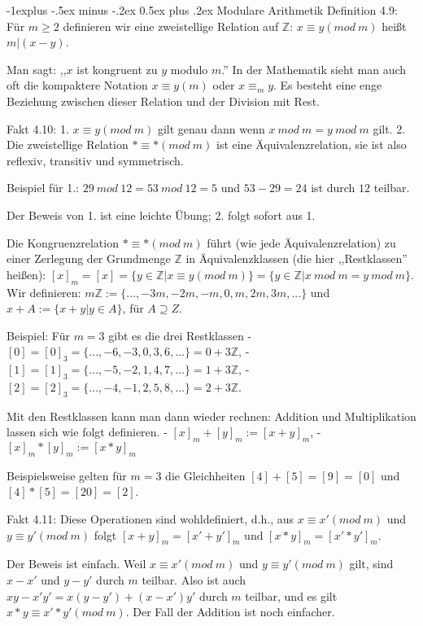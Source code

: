 \documentclass[a4paper]{article}
\makeatletter
\renewcommand{\subsection}{\@startsection{subsection}{2}{0mm}%
 {-1explus -.5ex minus -.2ex}%
 {0.5ex plus .2ex}%
 {\normalfont\normalsize\bfseries}}
\makeatother
\begin{document}
\begin{multicols}{3}
    \subsection{Modulare Arithmetik}
    Definition 4.9: Für $m\geq 2$ definieren wir eine zweistellige Relation auf $\mathbb{Z}$: $x\equiv y (mod\ m)$ heißt $m|(x-y)$.

    Man sagt: ,,$x$ ist kongruent zu $y$ modulo $m$.'' In der Mathematik sieht man auch oft die kompaktere Notation $x\equiv y(m)$ oder $x\equiv_m y$. Es besteht eine enge Beziehung zwischen dieser Relation und der Division mit Rest.

    Fakt 4.10:
    1. $x\equiv y(mod\ m)$ gilt genau dann wenn $x\ mod\ m=y\ mod\ m$ gilt.
    2. Die zweistellige Relation $*\equiv *(mod\ m)$ ist eine Äquivalenzrelation, sie ist also reflexiv, transitiv und symmetrisch.

    Beispiel für 1.: $29\ mod\ 12 = 53\ mod\ 12 = 5$ und $53-29 = 24$ ist durch $12$ teilbar.

    Der Beweis von 1. ist eine leichte Übung; 2. folgt sofort aus 1.

    Die Kongruenzrelation $* \equiv  *(mod\ m)$ führt (wie jede Äquivalenzrelation) zu einer Zerlegung der Grundmenge $\mathbb{Z}$ in Äquivalenzklassen (die hier ,,Restklassen'' heißen): $[x]_m= [x] =\{y\in\mathbb{Z}|x\equiv y(mod\ m)\}=\{y\in\mathbb{Z}|x\ mod\ m=y\ mod\ m\}$. Wir definieren: $m\mathbb{Z}:=\{...,-3m,-2m,-m,0,m,2m,3m,...\}$ und $x+A:=\{x+y|y\in A\}$, für $A\supseteq Z$.

    Beispiel: Für $m=3$ gibt es die drei Restklassen
    - $[0] = [0]_3 =\{...,-6,-3,0,3,6,...\}= 0 + 3\mathbb{Z}$,
    - $[1] = [1]_3 =\{...,-5,-2,1,4,7,...\}= 1 + 3\mathbb{Z}$,
    - $[2] = [2]_3 =\{...,-4,-1,2,5,8,...\}= 2 + 3\mathbb{Z}$.

    Mit den Restklassen kann man dann wieder rechnen: Addition und Multiplikation lassen sich wie folgt definieren.
    - $[x]_m+ [y]_m := [x+y]_m$,
    - $[x]_m*[y]_m := [x*y]_m$

    Beispielsweise gelten für $m=3$ die Gleichheiten $[4] + [5] = [9] = [0]$ und $[4]*[5] =[20] = [2]$.

    Fakt 4.11: Diese Operationen sind wohldefiniert, d.h., aus $x\equiv x'(mod\ m)$ und $y\equiv y'(mod\ m)$ folgt $[x+y]_m= [x'+y']_m$ und $[x*y]_m= [x'*y']_m$.

    Der Beweis ist einfach. Weil $x\equiv x' (mod\ m)$ und $y\equiv y' (mod\ m)$ gilt, sind $x-x'$ und $y-y'$ durch $m$ teilbar. Also ist auch $xy-x'y'=x(y-y') + (x-x')y'$ durch $m$ teilbar, und es gilt $x*y\equiv x'*y' (mod\ m)$. Der Fall der Addition ist noch einfacher.


\end{multicols}
\end{document}
